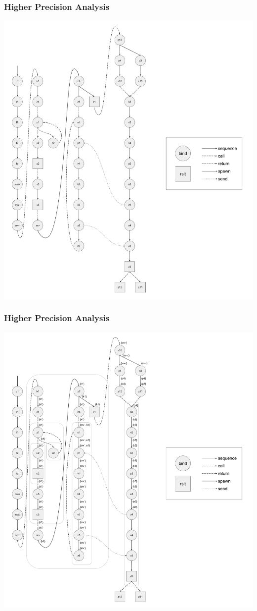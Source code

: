 \documentclass{beamer}
\begin{document}
\begin{frame}
\frametitle{Higher Precision Analysis}
\includegraphics[width=.7\textwidth]{cml-graph-lp.pdf}
\end{frame}

\begin{frame}
\frametitle{Higher Precision Analysis}
\includegraphics[width=.7\textwidth]{cml-liveness-analysis-k1.pdf}
\end{frame}
\end{document}
